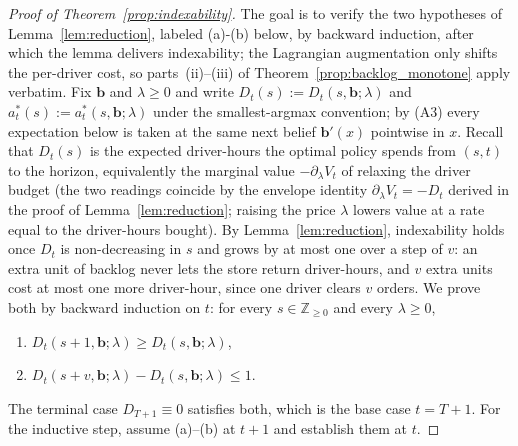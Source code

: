 \documentclass[preprint,11pt,authoryear]{elsarticle}
\newcommand{\bvec}[1]{\mathbf{#1}}
\theoremstyle{remark}
\begin{document}
\thmIndexability*
\begin{proof}[Proof of Theorem~\ref{prop:indexability}]
The goal is to verify the two hypotheses of Lemma~\ref{lem:reduction}, labeled (a)-(b) below, by backward induction, after which the lemma delivers indexability; the Lagrangian augmentation only shifts the per-driver cost, so parts~(ii)--(iii) of Theorem~\ref{prop:backlog_monotone} apply verbatim. Fix $\bvec{b}$ and $\lambda \ge 0$ and write $D_t(s) := D_t(s, \bvec{b}; \lambda)$ and $a^*_t(s) := a^*_t(s, \bvec{b}; \lambda)$ under the smallest-argmax convention; by (A3) every expectation below is taken at the same next belief $\bvec{b}'(x)$ pointwise in $x$. Recall that $D_t(s)$ is the expected driver-hours the optimal policy spends from $(s,t)$ to the horizon, equivalently the marginal value $-\partial_\lambda V_t$ of relaxing the driver budget (the two readings coincide by the envelope identity $\partial_\lambda V_t = -D_t$ derived in the proof of Lemma~\ref{lem:reduction}; raising the price $\lambda$ lowers value at a rate equal to the driver-hours bought). By Lemma~\ref{lem:reduction}, indexability holds once $D_t$ is non-decreasing in $s$ and grows by at most one over a step of $v$: an extra unit of backlog never lets the store return driver-hours, and $v$ extra units cost at most one more driver-hour, since one driver clears $v$ orders. We prove both by backward induction on $t$: for every $s \in \mathbb{Z}_{\ge 0}$ and every $\lambda \ge 0$,
\begin{enumerate}[label=(\alph*)]
  \item $D_t(s+1, \bvec{b}; \lambda) \ge D_t(s, \bvec{b}; \lambda)$,
  \item $D_t(s+v, \bvec{b}; \lambda) - D_t(s, \bvec{b}; \lambda) \le 1$.
\end{enumerate}
The terminal case $D_{T+1} \equiv 0$ satisfies both, which is the base case $t = T+1$. For the inductive step, assume (a)--(b) at $t+1$ and establish them at $t$.


\end{proof}
\end{document}
